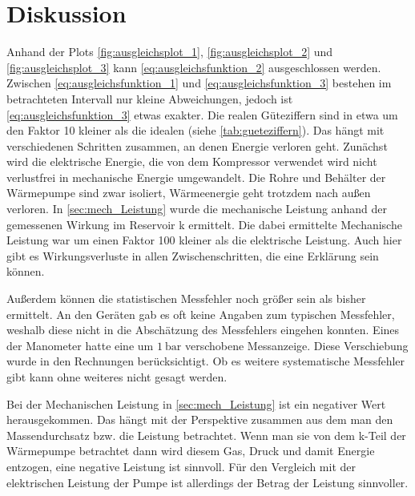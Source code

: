 \section{Diskussion}
Anhand der Plots \ref{fig:ausgleichsplot_1}, \ref{fig:ausgleichsplot_2} und \ref{fig:ausgleichsplot_3}
kann \eqref{eq:ausgleichsfunktion_2} ausgeschlossen werden. 
Zwischen \eqref{eq:ausgleichsfunktion_1} und \eqref{eq:ausgleichsfunktion_3} bestehen im betrachteten Intervall nur kleine Abweichungen,
jedoch ist \eqref{eq:ausgleichsfunktion_3} etwas exakter.
Die realen Güteziffern sind in etwa um den Faktor 10 kleiner als die idealen (siehe \ref{tab:gueteziffern}).
Das hängt mit verschiedenen Schritten zusammen, an denen Energie verloren geht.
Zunächst wird die elektrische Energie, die von dem Kompressor verwendet wird
nicht verlustfrei in mechanische Energie umgewandelt.
Die Rohre und Behälter der Wärmepumpe sind zwar isoliert, 
Wärmeenergie geht trotzdem nach außen verloren.
In \ref{sec:mech_Leistung} wurde die mechanische Leistung anhand der gemessenen Wirkung im Reservoir k   ermittelt.
Die dabei ermittelte Mechanische Leistung war um einen Faktor 100 kleiner als die elektrische Leistung.
Auch hier gibt es Wirkungsverluste in allen Zwischenschritten, die eine Erklärung sein können.

Außerdem können die statistischen Messfehler noch größer sein als bisher ermittelt.
An den Geräten gab es oft keine Angaben zum typischen Messfehler,
weshalb diese nicht in die Abschätzung des Messfehlers eingehen konnten.
Eines der Manometer hatte eine um $\qty{1}{\bar}$ verschobene Messanzeige.
Diese Verschiebung wurde in den Rechnungen berücksichtigt.
Ob es weitere systematische Messfehler gibt kann ohne weiteres nicht gesagt werden.

Bei der Mechanischen Leistung in \ref{sec:mech_Leistung} ist ein negativer Wert herausgekommen. 
Das hängt mit der Perspektive zusammen aus dem man den Massendurchsatz bzw. die Leistung betrachtet.
Wenn man sie von dem k-Teil der Wärmepumpe betrachtet dann wird diesem Gas, Druck und damit Energie entzogen,
eine negative Leistung ist sinnvoll.
Für den Vergleich mit der elektrischen Leistung der Pumpe ist allerdings der Betrag der Leistung sinnvoller.